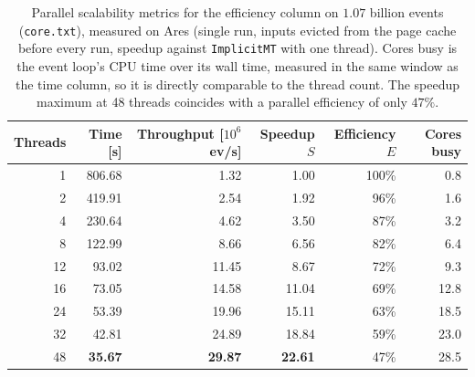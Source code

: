 \begin{table}[htbp]
\centering
\caption{Parallel scalability metrics for the efficiency column on $1.07$ billion events (\texttt{core.txt}), measured on Ares (single run, inputs evicted from the page cache before every run, speedup against \texttt{ImplicitMT} with one thread). Cores busy is the event loop's CPU time over its wall time, measured in the same window as the time column, so it is directly comparable to the thread count. The speedup maximum at 48 threads coincides with a parallel efficiency of only $47\%$.}
\label{tab:scalability-efficiency}
\begin{tabular}{rrrrrr}
\toprule
Threads & Time [s] & Throughput [$10^6$ ev/s] & Speedup $S$ & Efficiency $E$ & Cores busy \\
\midrule
 1 & 806.68 & 1.32 & 1.00 & 100\% & 0.8 \\
 2 & 419.91 & 2.54 & 1.92 & 96\% & 1.6 \\
 4 & 230.64 & 4.62 & 3.50 & 87\% & 3.2 \\
 8 & 122.99 & 8.66 & 6.56 & 82\% & 6.4 \\
12 & 93.02 & 11.45 & 8.67 & 72\% & 9.3 \\
16 & 73.05 & 14.58 & 11.04 & 69\% & 12.8 \\
24 & 53.39 & 19.96 & 15.11 & 63\% & 18.5 \\
32 & 42.81 & 24.89 & 18.84 & 59\% & 23.0 \\
48 & \textbf{35.67} & \textbf{29.87} & \textbf{22.61} & 47\% & 28.5 \\
\bottomrule
\end{tabular}
\end{table}
